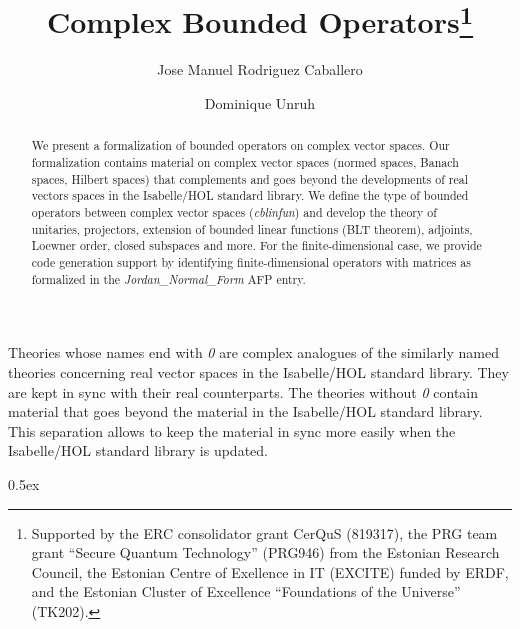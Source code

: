 \documentclass[11pt,a4paper]{article}
\begin{document}
\title{Complex Bounded Operators\thanks{Supported by the ERC consolidator grant CerQuS (819317), the PRG team grant “Secure Quantum Technology” (PRG946) from the Estonian Research Council, the Estonian Centre of Exellence in IT (EXCITE) funded by ERDF, and the Estonian Cluster of Excellence ``Foundations of the Universe'' (TK202).}}
\author[1]{Jose Manuel Rodriguez Caballero}
\author[1]{Dominique Unruh}

\maketitle

\begin{abstract}
  We present a formalization of bounded operators on complex vector spaces.
  Our formalization contains material on complex vector spaces (normed spaces, Banach spaces, Hilbert spaces)
  that complements and goes beyond the developments of real vectors spaces in the Isabelle/HOL standard library.
  We define the type of bounded operators between complex vector spaces (\textit{cblinfun}) and develop the theory of
  unitaries, projectors, extension of bounded linear functions (BLT theorem), adjoints, Loewner order, closed subspaces and more.
  For the finite-dimensional case, we provide code generation support by identifying finite-dimensional operators with matrices
  as formalized in the \textit{Jordan\_Normal\_Form} AFP entry.
\end{abstract}

\tableofcontents

Theories whose names end with \textit{0} are complex analogues of the similarly named theories concerning real vector spaces in the Isabelle/HOL standard library.
They are kept in sync with their real counterparts. The theories without \textit{0} contain material that goes beyond the material in the Isabelle/HOL standard library.
This separation allows to keep the material in sync more easily when the Isabelle/HOL standard library is updated.

\parindent 0pt\parskip 0.5ex





\end{document}
